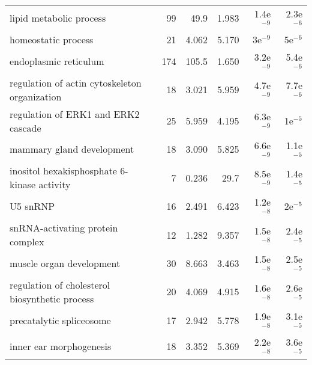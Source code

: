 \begin{longtable}{lrrrrr}
                           lipid metabolic process &                      99 &                    49.9 &      1.983 &          1.4e$^{-9}$ &          2.3e$^{-6}$ \\
                               homeostatic process &                      21 &                   4.062 &      5.170 &            3e$^{-9}$ &            5e$^{-6}$ \\
                             endoplasmic reticulum &                     174 &                   105.5 &      1.650 &          3.2e$^{-9}$ &          5.4e$^{-6}$ \\
     regulation of actin cytoskeleton organization &                      18 &                   3.021 &      5.959 &          4.7e$^{-9}$ &          7.7e$^{-6}$ \\
               regulation of ERK1 and ERK2 cascade &                      25 &                   5.959 &      4.195 &          6.3e$^{-9}$ &            1e$^{-5}$ \\
                         mammary gland development &                      18 &                   3.090 &      5.825 &          6.6e$^{-9}$ &          1.1e$^{-5}$ \\
       inositol hexakisphosphate 6-kinase activity &                       7 &                   0.236 &       29.7 &          8.5e$^{-9}$ &          1.4e$^{-5}$ \\
                                          U5 snRNP &                      16 &                   2.491 &      6.423 &          1.2e$^{-8}$ &            2e$^{-5}$ \\
                  snRNA-activating protein complex &                      12 &                   1.282 &      9.357 &          1.5e$^{-8}$ &          2.4e$^{-5}$ \\
                          muscle organ development &                      30 &                   8.663 &      3.463 &          1.5e$^{-8}$ &          2.5e$^{-5}$ \\
    regulation of cholesterol biosynthetic process &                      20 &                   4.069 &      4.915 &          1.6e$^{-8}$ &          2.6e$^{-5}$ \\
                          precatalytic spliceosome &                      17 &                   2.942 &      5.778 &          1.9e$^{-8}$ &          3.1e$^{-5}$ \\
                           inner ear morphogenesis &                      18 &                   3.352 &      5.369 &          2.2e$^{-8}$ &          3.6e$^{-5}$ \\

\end{longtable}
